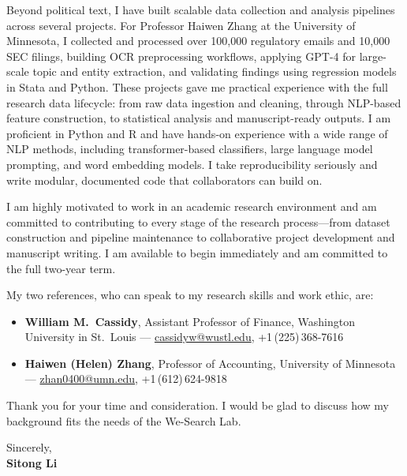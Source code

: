 \documentclass[12pt]{article}
\begin{document}
Beyond political text, I have built scalable data collection and analysis pipelines across several projects. For Professor Haiwen Zhang at the University of Minnesota, I collected and processed over 100,000 regulatory emails and 10,000 SEC filings, building OCR preprocessing workflows, applying GPT-4 for large-scale topic and entity extraction, and validating findings using regression models in Stata and Python. These projects gave me practical experience with the full research data lifecycle: from raw data ingestion and cleaning, through NLP-based feature construction, to statistical analysis and manuscript-ready outputs. I am proficient in Python and R and have hands-on experience with a wide range of NLP methods, including transformer-based classifiers, large language model prompting, and word embedding models. I take reproducibility seriously and write modular, documented code that collaborators can build on.

I am highly motivated to work in an academic research environment and am committed to contributing to every stage of the research process---from dataset construction and pipeline maintenance to collaborative project development and manuscript writing. I am available to begin immediately and am committed to the full two-year term.

My two references, who can speak to my research skills and work ethic, are:

\begin{itemize}
  \item \textbf{William M.\ Cassidy}, Assistant Professor of Finance, Washington University in St.\ Louis --- \href{mailto:cassidyw@wustl.edu}{cassidyw@wustl.edu}, +1\,(225)\,368-7616
  \item \textbf{Haiwen (Helen) Zhang}, Professor of Accounting, University of Minnesota --- \href{mailto:zhan0400@umn.edu}{zhan0400@umn.edu}, +1\,(612)\,624-9818
\end{itemize}

Thank you for your time and consideration. I would be glad to discuss how my background fits the needs of the We-Search Lab.

\vspace{1em}

\noindent Sincerely,\\[0.5em]
\textbf{Sitong Li}
\end{document}
